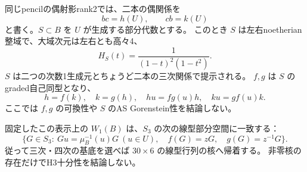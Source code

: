 \begin{theorem}
\label{thm:cubic-unit-pencil-rank2-base}
同じpencilの偶射影rank2では、二本の偶関係を
\[
 bc=h(U),\qquad cb=k(U)
\]
と書く。$S\subset B$ を $U$ が生成する部分代数とする。
このとき $S$ は左右noetherian整域で、大域次元は左右とも高々4、
\[
 H_S(t)=\frac1{(1-t)^2(1-t^2)}.
\]
$S$ は二つの次数1生成元とちょうど二本の三次関係で提示される。
$f,g$ は $S$ のgraded自己同型となり、
\[
 h=f(k),\quad k=g(h),\quad
 h u=fg(u)h,\quad k u=gf(u)k.
\]
ここでは $f,g$ の可換性や $S$ のAS Gorenstein性を結論しない。

固定したこの表示上の $W_1(B)$ は、$S_3$ の次の線型部分空間に一致する：
\[
 \{G\in S_3:\ Gu=\mu_B^{-1}(u)G\ (u\in U),\quad
 f(G)=zG,\quad g(G)=z^{-1}G\}.
\]
従って三次・四次の基底を選べば $30\times6$ の線型行列の核へ帰着する。
非零核の存在だけでH3十分性を結論しない。
\end{theorem}

